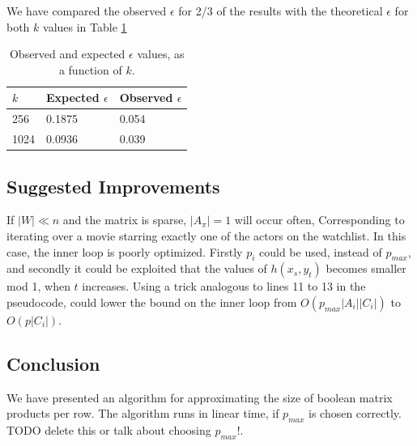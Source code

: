 \documentclass[a4paper,11pt]{article}
\begin{document}
We have compared the observed $\epsilon$ for 2/3 of the results with the theoretical $\epsilon$ for both $k$ values in Table \ref{tab:epsilon}

\begin{table}[H]
    \begin{center}
    \begin{tabular}{l|l|l}
    $k$    & Expected $\epsilon$      & Observed $\epsilon$ \\ \hline
    256  & 0.1875 & 0.054      \\ \hline
    1024 & 0.0936 & 0.039      \\
    \end{tabular}
    \end{center}
\caption{Observed and expected $\epsilon$ values, as a function of $k$.}\label{tab:epsilon}
\end{table}





%


\subsection{Suggested Improvements}
If $|W|\ll n$ and the matrix is sparse, $|A_{\pi}|=1$ will occur often, Corresponding to iterating over a movie starring exactly one of the actors on the watchlist. In this case, the inner loop is poorly optimized. Firstly $p_i$ could be used, instead of $p_{max}$, and secondly it could be exploited that the values of $h(x_s, y_t)$ becomes smaller mod 1, when $t$ increases. Using a trick analogous to lines 11 to 13 in the pseudocode, could lower the bound on the inner loop from $O(p_{max}|A_i||C_i|)$ to $O(p|C_i|)$.



\subsection{Conclusion}
We have presented an algorithm for approximating the size of boolean matrix products per row. The algorithm runs in linear time, if $p_{max}$ is chosen correctly. TODO delete this or talk about choosing $p_{max}$!.
\end{document}
